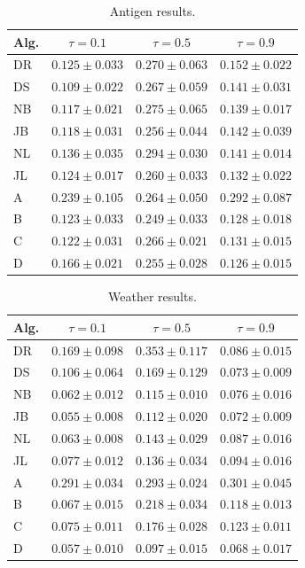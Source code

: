 \documentclass[twoside]{article} \usepackage{aistats2017}
\theoremstyle{definition}
\begin{document}
		\begin{table}
			\begin{center}
				\begin{tabular}{l|ccc}
					Alg. & $\tau = 0.1$     & $\tau = 0.5$  & $\tau = 0.9$      \\ \hline
					DR & $0.125 \pm 0.033$ & $0.270 \pm 0.063$ & $0.152 \pm 0.022$ \\
					DS & $\mathbf{0.109 \pm 0.022}$ & $0.267 \pm 0.059$ & $0.141 \pm 0.031$ \\
					NB & $0.117 \pm 0.021$ & $0.275 \pm 0.065$ & $0.139 \pm 0.017$ \\
					JB & $0.118 \pm 0.031$ & $0.256 \pm 0.044$ & $0.142 \pm 0.039$ \\
					NL & $0.136 \pm 0.035$ & $0.294 \pm 0.030$ & $0.141 \pm 0.014$ \\
					JL & $0.124 \pm 0.017$ & $0.260 \pm 0.033$ & $0.132 \pm 0.022$ \\
					A & $0.239 \pm 0.105$ & $0.264 \pm 0.050$ & $0.292 \pm 0.087$ \\
					B & $0.123 \pm 0.033$ & $\mathbf{0.249 \pm 0.033}$ & $0.128 \pm 0.018$ \\
					C & $0.122 \pm 0.031$ & $0.266 \pm 0.021$ & $0.131 \pm 0.015$ \\
					D & $0.166 \pm 0.021$ & $0.255 \pm 0.028$ & $\mathbf{0.126 \pm 0.015}$
				\end{tabular}
			\end{center}
			\caption{Antigen results.}
			\label{table:antigen}
		\end{table}
		
		\begin{table}
			\begin{center}
				\begin{tabular}{l|ccc}
					Alg. & $\tau = 0.1$     & $\tau = 0.5$  & $\tau = 0.9$      \\ \hline
					DR & $0.169 \pm 0.098$ & $0.353 \pm 0.117$ & $0.086 \pm 0.015$ \\
					DS & $0.106 \pm 0.064$ & $0.169 \pm 0.129$ & $0.073 \pm 0.009$ \\
					NB & $\mathbf{0.062 \pm 0.012}$ & $0.115 \pm 0.010$ & $0.076 \pm 0.016$ \\
					JB & $0.055 \pm 0.008$ & $0.112 \pm 0.020$ & $0.072 \pm 0.009$ \\
					NL & $0.063 \pm 0.008$ & $0.143 \pm 0.029$ & $0.087 \pm 0.016$ \\
					JL & $0.077 \pm 0.012$ & $0.136 \pm 0.034$ & $0.094 \pm 0.016$ \\
					A & $0.291 \pm 0.034$ & $0.293 \pm 0.024$ & $0.301 \pm 0.045$ \\
					B & $0.067 \pm 0.015$ & $0.218 \pm 0.034$ & $0.118 \pm 0.013$ \\
					C & $0.075 \pm 0.011$ & $0.176 \pm 0.028$ & $0.123 \pm 0.011$ \\
					D & $0.057 \pm 0.010$ & $\mathbf{0.097 \pm 0.015}$ & $\mathbf{0.068 \pm 0.017}$
				\end{tabular}
			\end{center}
			\caption{Weather results.}
			\label{table:weather}
		\end{table}
		
\end{document}
